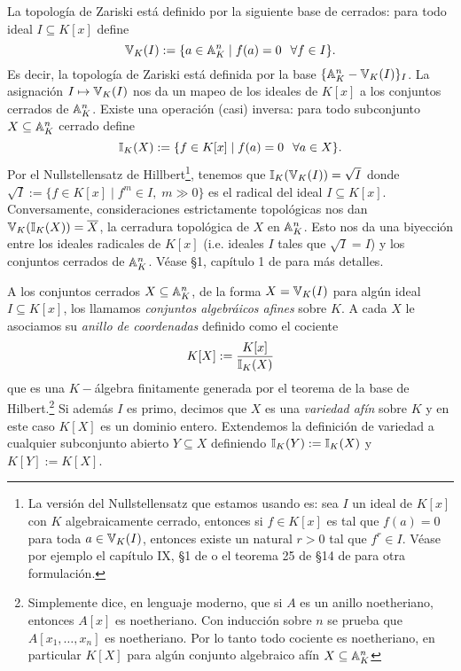 \documentclass[../../tesis_maestria]{subfiles}
\begin{document}
\begin{nota}
	La topología de Zariski está definido por la siguiente base de cerrados: para todo ideal $I\subseteq K[x]$ define
	\[
		\mathbb{V}_K(I):=\{a\in\mathbb{A}^n_K\mid f(a)=0\,\;\;\forall f\in I\}.
	\]
	Es decir, la topología de Zariski está definida por la base $\{\mathbb{A}^n_K-\mathbb{V}_K(I)\}_I$. La asignación $I\mapsto\mathbb{V}_K(I)$ nos da un mapeo de los ideales de $K[x]$ a los conjuntos cerrados de $\mathbb{A}^n_K$. Existe una operación (casi) inversa: para todo subconjunto $X\subseteq\mathbb{A}^n_K$ cerrado define
	\[
		\mathbb{I}_K(X):=\{f\in K[x]\mid f(a)=0\,\;\; \forall a\in X\}.
	\]
	Por el Nullstellensatz de Hillbert\footnote{La versión del Nullstellensatz que estamos usando es: sea $I$ un ideal de $K[x]$ con $K$ algebraicamente cerrado, entonces si $f\in K[x]$ es tal que $f(a)=0$ para toda $a\in\mathbb{V}_K(I)$, entonces existe un natural $r>0$ tal que $f^r\in I$. Véase por ejemplo el capítulo IX, \S1 de \cite{LangA} o el teorema 25 de \S14 de \cite{MatsumuraCA} para otra formulación.}, tenemos que $\mathbb{I}_K(\mathbb{V}_K(I))=\sqrt{I}$ donde $\sqrt{I}:=\{f\in K[x]\mid f^m\in I,\; m\gg 0\}$ es el radical del ideal $I\subseteq K[x]$. Conversamente, consideraciones estrictamente topológicas nos dan $\mathbb{V}_K(\mathbb{I}_K(X))=\overline{X}$, la cerradura topológica de $X$ en $\mathbb{A}^n_K$. Esto nos da una biyección entre los ideales radicales de $K[x]$ (i.e. ideales $I$ tales que $\sqrt{I}=I$) y los conjuntos cerrados de $\mathbb{A}^n_K$. Véase \S1, capítulo 1 de \cite{HartshorneAG} para más detalles.
\end{nota}

\begin{defin}
	A los conjuntos cerrados $X\subseteq\mathbb{A}^n_K$, de la forma $X=\mathbb{V}_K(I)$ para algún ideal $I\subseteq K[x]$, los llamamos \emph{conjuntos algebráicos afines} sobre $K$. A cada $X$ le asociamos su \emph{anillo de coordenadas} definido como el cociente
	\[
		K[X]:=\frac{K[x]}{\mathbb{I}_K(X)}
	\]
	que es una $K-$álgebra finitamente generada por el teorema de la base de Hilbert.\footnote{Simplemente dice, en lenguaje moderno, que si $A$ es un anillo noetheriano, entonces $A[x]$ es noetheriano. Con inducción sobre $n$ se prueba que $A[x_1,\ldots,x_n]$ es noetheriano. Por lo tanto todo cociente es noetheriano, en particular $K[X]$ para algún conjunto algebraico afín $X\subseteq\mathbb{A}^n_K$} Si además $I$ es primo, decimos que $X$ es una \emph{variedad afín} sobre $K$ y en este caso $K[X]$ es un dominio entero. Extendemos la definición de variedad a cualquier subconjunto abierto $Y\subseteq X$ definiendo $\mathbb{I}_K(Y):=\mathbb{I}_K(X)$ y $K[Y]:= K[X]$.
\end{defin}
\end{document}
